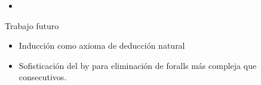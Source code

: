 \begin{itemize}
    \item {}
\end{itemize}

Trabajo futuro

\begin{itemize}
    \item Inducción como axioma de deducción natural
    \item Sofisticación del by para eliminación de foralls más compleja que consecutivos.
\end{itemize}